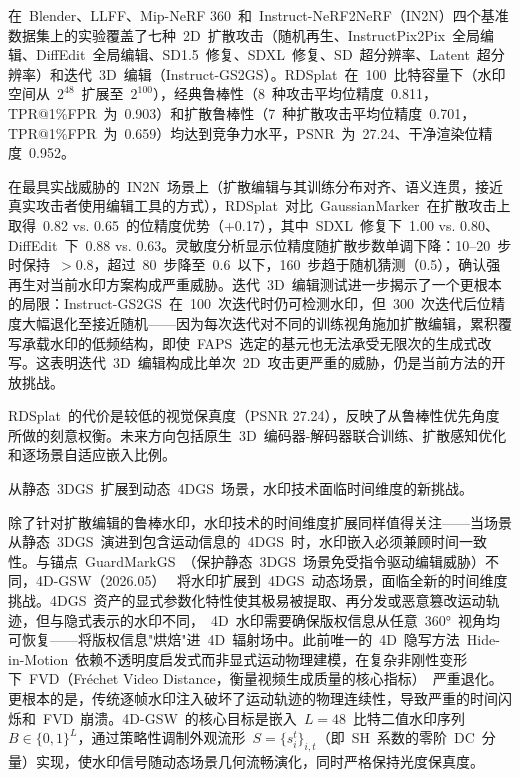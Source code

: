 在~Blender、LLFF、Mip-NeRF 360~和~Instruct-NeRF2NeRF（IN2N）四个基准数据集上的实验覆盖了七种~2D~扩散攻击（随机再生、InstructPix2Pix~全局编辑、DiffEdit~全局编辑、SD1.5~修复、SDXL~修复、SD~超分辨率、Latent~超分辨率）和迭代~3D~编辑（Instruct-GS2GS）。RDSplat~在~100~比特容量下（水印空间从~$2^{48}$~扩展至~$2^{100}$），经典鲁棒性（8~种攻击平均位精度~0.811，TPR@1\%FPR~为~0.903）和扩散鲁棒性（7~种扩散攻击平均位精度~0.701，TPR@1\%FPR~为~0.659）均达到竞争力水平，PSNR~为~27.24、干净渲染位精度~0.952。

在最具实战威胁的~IN2N~场景上（扩散编辑与其训练分布对齐、语义连贯，接近真实攻击者使用编辑工具的方式），RDSplat~对比~GaussianMarker~在扩散攻击上取得~0.82 vs. 0.65~的位精度优势（+0.17），其中~SDXL~修复下~1.00 vs. 0.80、DiffEdit~下~0.88 vs. 0.63。灵敏度分析显示位精度随扩散步数单调下降：10--20~步时保持~$>$0.8，超过~80~步降至~0.6~以下，160~步趋于随机猜测（0.5），确认强再生对当前水印方案构成严重威胁。迭代~3D~编辑测试进一步揭示了一个更根本的局限：Instruct-GS2GS~在~100~次迭代时仍可检测水印，但~300~次迭代后位精度大幅退化至接近随机——因为每次迭代对不同的训练视角施加扩散编辑，累积覆写承载水印的低频结构，即使~FAPS~选定的基元也无法承受无限次的生成式改写。这表明迭代~3D~编辑构成比单次~2D~攻击更严重的威胁，仍是当前方法的开放挑战。

RDSplat~的代价是较低的视觉保真度（PSNR 27.24），反映了从鲁棒性优先角度所做的刻意权衡。未来方向包括原生~3D~编码器-解码器联合训练、扩散感知优化和逐场景自适应嵌入比例。

从静态~3DGS~扩展到动态~4DGS~场景，水印技术面临时间维度的新挑战。

除了针对扩散编辑的鲁棒水印，水印技术的时间维度扩展同样值得关注——当场景从静态~3DGS~演进到包含运动信息的~4DGS~时，水印嵌入必须兼顾时间一致性。与锚点~GuardMarkGS~（保护静态~3DGS~场景免受指令驱动编辑威胁）不同，4D-GSW（2026.05）~\cite{2605_22342} 将水印扩展到~4DGS~动态场景，面临全新的时间维度挑战。4DGS~资产的显式参数化特性使其极易被提取、再分发或恶意篡改运动轨迹，但与隐式表示的水印不同，~4D~水印需要确保版权信息从任意~360°~视角均可恢复——将版权信息"烘焙"进~4D~辐射场中。此前唯一的~4D~隐写方法~Hide-in-Motion~依赖不透明度启发式而非显式运动物理建模，在复杂非刚性变形下~FVD（Fréchet Video Distance，衡量视频生成质量的核心指标）~严重退化。更根本的是，传统逐帧水印注入破坏了运动轨迹的物理连续性，导致严重的时间闪烁和~FVD~崩溃。4D-GSW~的核心目标是嵌入~$L=48$~比特二值水印序列~$B \in \{0,1\}^L$，通过策略性调制外观流形~$S = \{s_i^t\}_{i,t}$（即~SH~系数的零阶~DC~分量）实现，使水印信号随动态场景几何流畅演化，同时严格保持光度保真度。

